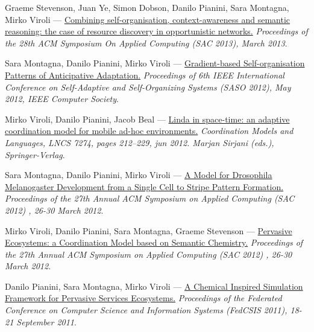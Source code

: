 \documentclass[10pt]{article}
\makeatletter
\newlength{\bibhang}
\newlength{\bibsep}
 {\@listi \global\bibsep\itemsep \global\advance\bibsep by\parsep}
\newenvironment{bibsection}%
        {\vspace{-\baselineskip}\begin{list}{}{%
       \setlength{\leftmargin}{\bibhang}%
       \setlength{\itemindent}{-\leftmargin}%
       \setlength{\itemsep}{\bibsep}%
       \setlength{\parsep}{\z@}%
        \setlength{\partopsep}{0pt}%
        \setlength{\topsep}{0pt}}}
        {\end{list}\vspace{-.6\baselineskip}}
\renewcommand{\section}[2]%
        {\pagebreak[3]\vspace{1.3\baselineskip}%
         \phantomsection\addcontentsline{toc}{section}{#1}%
         \hspace{0in}%
         \marginpar{
         \raggedright \scshape #1}#2}
\makeatother
\begin{document}
\section{Conference\\Publications} \begin{bibsection}
    \item Graeme Stevenson, Juan Ye, Simon Dobson, Danilo Pianini, Sara Montagna, Mirko Viroli --- \href{http://www.apice.unibo.it/xwiki/bin/view/Publications/SemMatchingSAC2013}{Combining self-organisation, context-awareness and semantic reasoning: the case of resource discovery in opportunistic networks.} \emph{Proceedings of the 28th ACM Symposium On Applied Computing (SAC 2013), March 2013}.
    
    \item Sara Montagna, Danilo Pianini, Mirko Viroli --- \href{http://apice.unibo.it/xwiki/bin/view/Publications/AnticipativeGradientSASO2012}{Gradient-based Self-organisation Patterns of Anticipative Adaptation.} \emph{Proceedings of 6th IEEE International Conference on Self-Adaptive and Self-Organizing Systems (SASO 2012), May 2012, IEEE Computer Society}.
    
    \item Mirko Viroli, Danilo Pianini, Jacob Beal --- \href{http://apice.unibo.it/xwiki/bin/view/Publications/SpatialCoordination2012}{Linda in space-time: an adaptive coordination model for mobile ad-hoc environments.} \emph{Coordination Models and Languages, LNCS 7274, pages 212--229, jun 2012. Marjan Sirjani (eds.), Springer-Verlag}.
    
    \item Sara Montagna, Danilo Pianini, Mirko Viroli --- \href{http://www.alice.unibo.it/xwiki/bin/view/Publications/BioSac2012}{A Model for Drosophila Melanogaster Development from a Single Cell to Stripe Pattern Formation.} \emph{Proceedings of the 27th Annual ACM Symposium on Applied Computing (SAC 2012) , 26-30 March 2012}.
    
    \item Mirko Viroli, Danilo Pianini, Sara Montagna, Graeme Stevenson --- \href{http://apice.unibo.it/xwiki/bin/view/Publications/SapereEcoLawsSac2012}{Pervasive Ecosystems: a Coordination Model based on Semantic Chemistry.} \emph{Proceedings of the 27th Annual ACM Symposium on Applied Computing (SAC 2012) , 26-30 March 2012}.

    \item Danilo Pianini, Sara Montagna, Mirko Viroli --- \href{http://www.alice.unibo.it/xwiki/bin/view/Publications/PianiniMASS11}{A Chemical Inspired Simulation Framework for Pervasive Services Ecosystems.} \emph{Proceedings of the Federated Conference on Computer Science and Information Systems (FedCSIS 2011), 18-21 September 2011}.


\end{bibsection}
\end{document}
